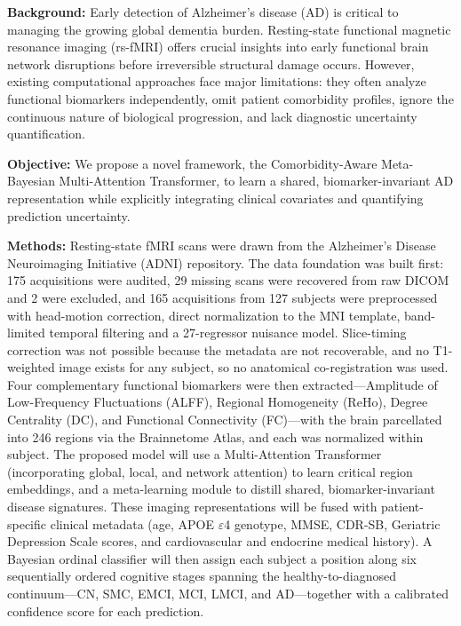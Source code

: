 \documentclass{ssnreview}
\begin{document}
\setcounter{tocdepth}{1}
\makereviewtitle
\reviewfrontmatter

\begin{reviewabstract}
\textbf{Background:} Early detection of Alzheimer's disease (AD) is critical to managing the
growing global dementia burden. Resting-state functional magnetic resonance imaging
(rs-fMRI) offers crucial insights into early functional brain network disruptions before
irreversible structural damage occurs. However, existing computational approaches face
major limitations: they often analyze functional biomarkers independently, omit patient
comorbidity profiles, ignore the continuous nature of biological progression, and lack
diagnostic uncertainty quantification.

\textbf{Objective:} We propose a novel framework, the Comorbidity-Aware Meta-Bayesian
Multi-Attention Transformer, to learn a shared, biomarker-invariant AD representation while
explicitly integrating clinical covariates and quantifying prediction uncertainty.

\textbf{Methods:} Resting-state fMRI scans were drawn from the Alzheimer's Disease
Neuroimaging Initiative (ADNI) repository. The data foundation was built first: 175
acquisitions were audited, 29 missing scans were recovered from raw DICOM and 2 were
excluded, and 165 acquisitions from 127 subjects were preprocessed with head-motion
correction, direct normalization to the MNI template, band-limited temporal filtering and a
27-regressor nuisance model. Slice-timing correction was not possible because the metadata
are not recoverable, and no T1-weighted image exists for any subject, so no anatomical
co-registration was used. Four complementary functional biomarkers were then
extracted---Amplitude of Low-Frequency Fluctuations (ALFF), Regional Homogeneity (ReHo),
Degree Centrality (DC), and Functional Connectivity (FC)---with the brain parcellated into
246 regions via the Brainnetome Atlas, and each was normalized within subject. The proposed
model will use a Multi-Attention Transformer (incorporating global, local, and network
attention) to learn critical region embeddings, and a meta-learning module to distill
shared, biomarker-invariant disease signatures. These imaging representations will be fused
with patient-specific clinical metadata (age, APOE $\varepsilon$4 genotype, MMSE, CDR-SB,
Geriatric Depression Scale scores, and cardiovascular and endocrine medical history). A
Bayesian ordinal classifier will then assign each subject a position along six sequentially
ordered cognitive stages spanning the healthy-to-diagnosed continuum---CN, SMC, EMCI, MCI,
LMCI, and AD---together with a calibrated confidence score for each prediction.


\end{reviewabstract}
\end{document}
